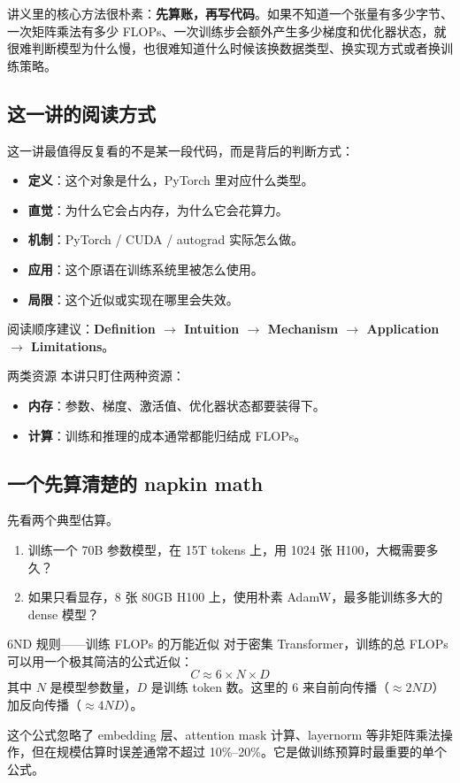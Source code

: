 \documentclass[a4paper]{article}
\begin{document}
讲义里的核心方法很朴素：\textbf{先算账，再写代码}。如果不知道一个张量有多少字节、一次矩阵乘法有多少 FLOPs、一次训练步会额外产生多少梯度和优化器状态，就很难判断模型为什么慢，也很难知道什么时候该换数据类型、换实现方式或者换训练策略。

\subsection{这一讲的阅读方式}

这一讲最值得反复看的不是某一段代码，而是背后的判断方式：
\begin{itemize}
    \item \textbf{定义}：这个对象是什么，PyTorch 里对应什么类型。
    \item \textbf{直觉}：为什么它会占内存，为什么它会花算力。
    \item \textbf{机制}：PyTorch / CUDA / autograd 实际怎么做。
    \item \textbf{应用}：这个原语在训练系统里被怎么使用。
    \item \textbf{局限}：这个近似或实现在哪里会失效。
\end{itemize}

阅读顺序建议：\textbf{Definition $\to$ Intuition $\to$ Mechanism $\to$ Application $\to$ Limitations}。

\begin{knowledgebox}{两类资源}
本讲只盯住两种资源：
\begin{itemize}
    \item \textbf{内存}：参数、梯度、激活值、优化器状态都要装得下。
    \item \textbf{计算}：训练和推理的成本通常都能归结成 FLOPs。
\end{itemize}
\end{knowledgebox}

\subsection{一个先算清楚的 napkin math}

先看两个典型估算。

\begin{enumerate}
    \item 训练一个 70B 参数模型，在 15T tokens 上，用 1024 张 H100，大概需要多久？
    \item 如果只看显存，8 张 80GB H100 上，使用朴素 AdamW，最多能训练多大的 dense 模型？
\end{enumerate}

\begin{importantbox}{6ND 规则——训练 FLOPs 的万能近似}
对于密集 Transformer，训练的总 FLOPs 可以用一个极其简洁的公式近似：
$$
C \approx 6 \times N \times D
$$
其中 $N$ 是模型参数量，$D$ 是训练 token 数。这里的 6 来自前向传播（$\approx 2ND$）加反向传播（$\approx 4ND$）。

这个公式忽略了 embedding 层、attention mask 计算、layernorm 等非矩阵乘法操作，但在规模估算时误差通常不超过 10\%--20\%。它是做训练预算时最重要的单个公式。
\end{importantbox}
\end{document}
